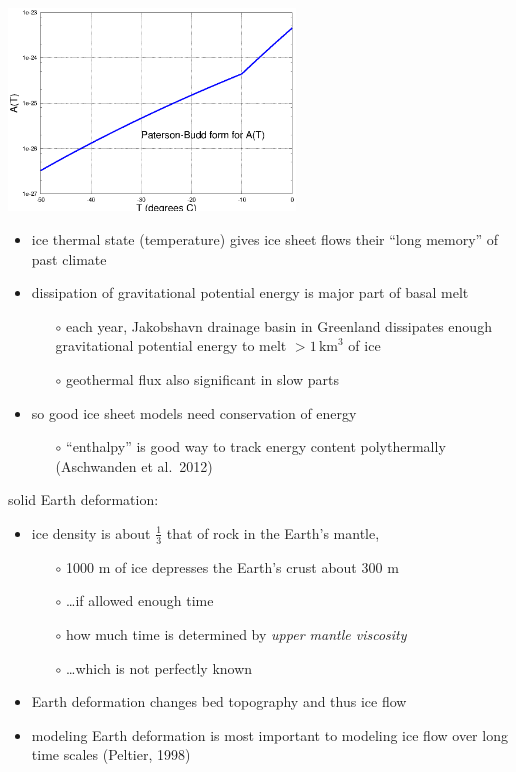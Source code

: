 \documentclass[titlepage,letterpaper,final,11pt]{scrartcl}
\begin{document}
\includegraphics[width=3.0in]{AofT}


\begin{itemize}
\item ice thermal state (temperature) gives ice sheet flows their ``long memory'' of past climate
\item dissipation of gravitational potential energy is major part of basal melt
  \begin{itemize}
  \item[$\circ$] each year, Jakobshavn drainage basin in Greenland dissipates enough gravitational potential energy to melt $> 1\,\text{km}^3$ of ice
  \item[$\circ$] geothermal flux also significant in slow parts
  \end{itemize}
\item so good ice sheet models need conservation of energy
  \begin{itemize}
  \item[$\circ$] ``enthalpy'' is good way to track energy content polythermally (Aschwanden et al.~2012)\nocite{AschwandenBuelerKhroulevBlatter}
  \end{itemize}
\end{itemize}

solid Earth deformation:

\begin{itemize}
\item ice density is about $\frac{1}{3}$ that of rock in the Earth's mantle,
  \begin{itemize}
  \item[$\circ$] 1000 m of ice depresses the Earth's crust about 300 m
  \item[$\circ$] \dots if allowed enough time
  \item[$\circ$] how much time is determined by \emph{upper mantle viscosity}
  \item[$\circ$] \dots which is not perfectly known
  \end{itemize}
\item Earth deformation changes bed topography and thus ice flow
\item modeling Earth deformation is most important to modeling ice flow over long time scales (Peltier, 1998)\nocite{Peltier1998review}
\end{itemize}
\end{document}
